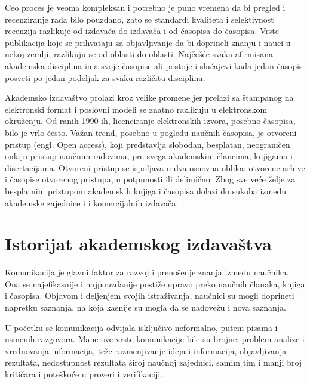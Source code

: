 \documentclass[12pt,a4paper]{article}
\begin{document}
   Ceo proces je veoma kompleksan i potrebno je puno vremena da bi pregled i recenziranje rada bilo pouzdano, zato se standardi kvaliteta i selektivnost recenzija razlikuje od izdavača do izdavača i od časopisa do časopisa. Vrste publikacija koje se prihvataju za objavljivanje da bi doprineli znanju i nauci u nekoj zemlji, razlikuju se od oblasti do oblasti. Najčešće svaka afirmisana akademska disciplina ima svoje časopise ali postoje i slučajevi kada jedan časopis posveti po jedan podeljak za svaku različitu disciplinu.
   
   Akademsko izdavaštvo prolazi kroz velike promene jer prelazi sa štampanog na elektronski format i poslovni modeli se znatno razlikuju u elektronskom okruženju. Od ranih 1990-ih, licenciranje elektronskih izvora, posebno časopisa, bilo je vrlo često. Važan trend, posebno u pogledu naučnih časopisa, je otvoreni pristup (engl. Open access), koji predstavlja slobodan, besplatan, neograničen onlajn pristup naučnim radovima, pre svega akademskim člancima, knjigama i disertacijama. Otvoreni pristup se ispoljava u dva osnovna oblika: otvorene arhive i časopise otvorenog pristupa, u potpunosti ili delimično. Zbog sve veće želje za besplatnim pristupom akademskih knjiga i časopisa dolazi do sukoba između akademske zajednice i i komercijalnih izdavača.



\section{\large\textbf{Istorijat akademskog izdavaštva}}

\indent 

    Komunikacija je glavni faktor za razvoj i prenošenje znanja između naučnika. Ona se najefikasnije i najpouzdanije postiže upravo preko naučnih članaka, knjiga i časopisa. Objavom i deljenjem svojih istraživanja, naučnici su mogli doprineti napretku saznanja, na koja kasnije su mogla da se nadovežu i nova saznanja.
  
   U početku se komunikacija odvijala isključivo neformalno, putem pisama i usmenih razgovora. Mane ove vrste komunikacije bile su brojne: problem analize i vrednovanja informacija, teže razmenjivanje ideja i informacija, objavljivanja rezultata, nedostupnost rezultata široj naučnoj zajednici, samim tim i manji broj kritičara i poteškoće u proveri i verifikaciji.
   
\end{document}
